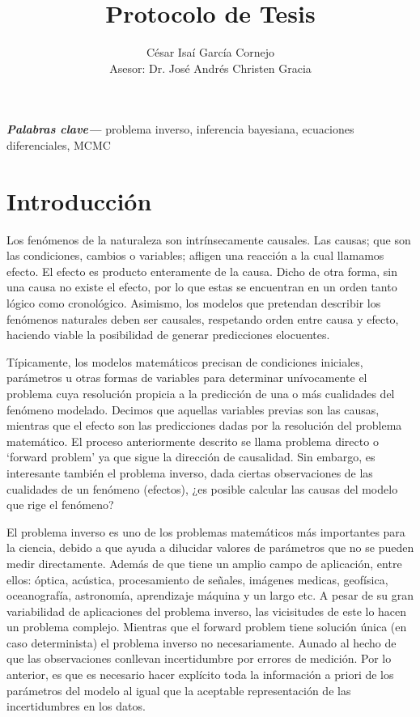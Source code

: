 \documentclass{article}
\title{Protocolo de Tesis}
\author{César Isaí García Cornejo \\
Asesor: Dr. José Andrés Christen Gracia}
\providecommand{\keywords}[1]
{
  \small	
  \textbf{\textit{Palabras clave---}} #1
}
\begin{document}
\maketitle

\keywords{problema inverso, inferencia bayesiana, ecuaciones diferenciales, MCMC}

\section{Introducción}

Los fenómenos de la naturaleza son intrínsecamente causales. Las causas; que son las condiciones, cambios o variables; afligen una reacción a la cual llamamos efecto. El efecto es producto enteramente de la causa. Dicho de otra forma, sin una causa no existe el efecto, por lo que estas se encuentran en un orden tanto lógico como cronológico. Asimismo, los modelos que pretendan describir los fenómenos naturales deben ser causales, respetando orden entre causa y efecto, haciendo viable la posibilidad de generar predicciones elocuentes. 

Típicamente, los modelos matemáticos precisan de condiciones iniciales, parámetros u otras formas de variables para determinar unívocamente el problema cuya resolución propicia a la predicción de una o más cualidades del fenómeno modelado. Decimos que aquellas variables previas son las causas, mientras que el efecto son las predicciones dadas por la resolución del problema matemático.
El proceso anteriormente descrito se llama problema directo o `forward problem' ya que sigue la dirección de causalidad. Sin embargo, es interesante también el problema inverso, dada ciertas observaciones de las cualidades de un fenómeno (efectos), ¿es posible calcular las causas del modelo que rige el fenómeno?

El problema inverso es uno de los problemas matemáticos más importantes para la ciencia, debido a que ayuda a dilucidar valores de parámetros que no se pueden medir directamente. Además de que tiene un amplio campo de aplicación, entre ellos: óptica, acústica, procesamiento de señales, imágenes medicas, geofísica, oceanografía, astronomía, aprendizaje máquina y un largo etc. A pesar de su gran variabilidad de aplicaciones del problema inverso, las vicisitudes de este lo hacen un problema complejo. Mientras que el forward problem tiene solución única (en caso determinista) el problema inverso no necesariamente. Aunado al hecho de que las observaciones conllevan incertidumbre por errores de medición. Por lo anterior, es que es necesario hacer explícito toda la información a priori de los parámetros del modelo al igual que la aceptable representación de las incertidumbres en los datos.
\end{document}

